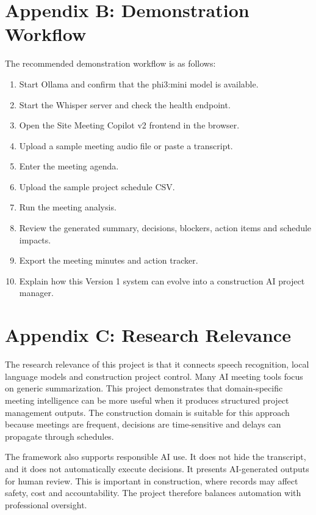 \documentclass[11pt,a4paper]{article}
\begin{document}
\section*{Appendix B: Demonstration Workflow}

The recommended demonstration workflow is as follows:

\begin{enumerate}[leftmargin=0.6cm]
    \item Start Ollama and confirm that the phi3:mini model is available.
    \item Start the Whisper server and check the health endpoint.
    \item Open the Site Meeting Copilot v2 frontend in the browser.
    \item Upload a sample meeting audio file or paste a transcript.
    \item Enter the meeting agenda.
    \item Upload the sample project schedule CSV.
    \item Run the meeting analysis.
    \item Review the generated summary, decisions, blockers, action items and schedule impacts.
    \item Export the meeting minutes and action tracker.
    \item Explain how this Version 1 system can evolve into a construction AI project manager.
\end{enumerate}

\section*{Appendix C: Research Relevance}

The research relevance of this project is that it connects speech recognition, local language models and construction project control. Many AI meeting tools focus on generic summarization. This project demonstrates that domain-specific meeting intelligence can be more useful when it produces structured project management outputs. The construction domain is suitable for this approach because meetings are frequent, decisions are time-sensitive and delays can propagate through schedules.

The framework also supports responsible AI use. It does not hide the transcript, and it does not automatically execute decisions. It presents AI-generated outputs for human review. This is important in construction, where records may affect safety, cost and accountability. The project therefore balances automation with professional oversight.
\end{document}
